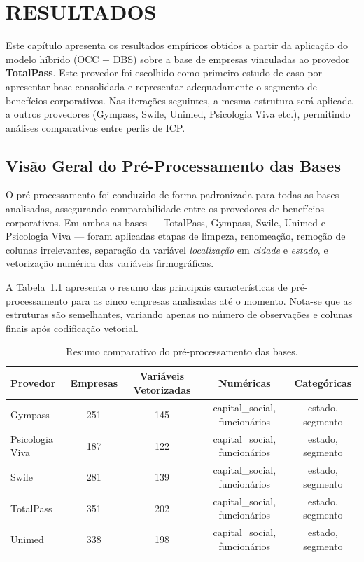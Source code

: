 \chapter{RESULTADOS}

\noindent
Este capítulo apresenta os resultados empíricos obtidos a partir da aplicação do modelo híbrido (OCC + DBS) sobre a base de empresas vinculadas ao provedor \textbf{TotalPass}. Este provedor foi escolhido como primeiro estudo de caso por apresentar base consolidada e representar adequadamente o segmento de benefícios corporativos. Nas iterações seguintes, a mesma estrutura será aplicada a outros provedores (Gympass, Swile, Unimed, Psicologia Viva etc.), permitindo análises comparativas entre perfis de ICP.


\section{Visão Geral do Pré-Processamento das Bases}

O pré-processamento foi conduzido de forma padronizada para todas as bases analisadas, assegurando comparabilidade entre os provedores de benefícios corporativos. Em ambas as bases — TotalPass, Gympass, Swile, Unimed e Psicologia Viva — foram aplicadas etapas de limpeza, renomeação, remoção de colunas irrelevantes, separação da variável \textit{localização} em \textit{cidade} e \textit{estado}, e vetorização numérica das variáveis firmográficas.

A Tabela~\ref{tab:7_1_pre_all} apresenta o resumo das principais características de pré-processamento para as cinco empresas analisadas até o momento. Nota-se que as estruturas são semelhantes, variando apenas no número de observações e colunas finais após codificação vetorial.

\begin{table}[H]
\centering
\caption{Resumo comparativo do pré-processamento das bases.}
\label{tab:7_1_pre_all}
\begin{tabular}{lcccc}
\toprule
\textbf{Provedor} & \textbf{Empresas} & \textbf{Variáveis Vetorizadas} & \textbf{Numéricas} & \textbf{Categóricas} \\
\midrule
Gympass & 251 & 145 & capital\_social, funcionários & estado, segmento \\
Psicologia Viva & 187 & 122 & capital\_social, funcionários & estado, segmento \\
Swile & 281 & 139 & capital\_social, funcionários & estado, segmento \\
TotalPass & 351 & 202 & capital\_social, funcionários & estado, segmento \\
Unimed & 338 & 198 & capital\_social, funcionários & estado, segmento \\
\bottomrule
\end{tabular}
\end{table}

